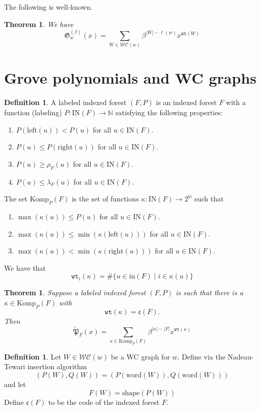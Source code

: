 \documentclass{amsart}
\newtheorem{theorem}[lemma]{Theorem}
\newcommand{\grove}{\widetilde{\mathfrak{P}}}
\theoremstyle{definition}
\newtheorem{definition}[lemma]{Definition}
\theoremstyle{remark}
\numberwithin{equation}{subsection}
\newcommand{\wtt}{\mathtt{wt}}
\newcommand{\WC}{\mathcal{WC}}
\newcommand{\code}{\mathfrak{c}}
\begin{document}
The following is well-known.
\begin{theorem}
We have
$$\mathfrak{G}^{(\beta)}_w(x) = \sum_{W\in \WC(w)} \beta^{|W|-\ell(w)}x^{\wtt(W)}$$
\end{theorem}


\section{Grove polynomials and WC graphs}

\begin{definition}
A labeled indexed forest $(F,P)$ is an indexed forest $F$ with a function (labeling) $P:\mathrm{IN}(F)\to\mathbb{N}$ satisfying the following properties:
\begin{enumerate}
\item $P(\mathrm{left}(u)) < P(u)$ for all $u\in \mathrm{IN}(F)$.
\item $P(u)\leq P(\mathrm{right}(u))$ for all $u\in \mathrm{IN}(F)$.
\item $P(u)\geq \rho_F(u)$ for all $u\in \mathrm{IN}(F)$.
\item $P(u)\leq \lambda_F(u)$ for all $u\in \mathrm{IN}(F)$.
\end{enumerate}

The set $\mathrm{Komp}_P(F)$ is the set of functions $\kappa:\mathrm{IN}(F)\to 2^{\mathbb{N}}$ such that 

\begin{enumerate}
\item $\max(\kappa(u))\leq P(u)$ for all $u\in \mathrm{IN}(F)$.
\item $\max(\kappa(u))\leq \min(\kappa(\mathrm{left}(u)))$ for all $u\in \mathrm{IN}(F)$.
\item $\max(\kappa(u))< \min(\kappa(\mathrm{right}(u)))$ for all $u\in \mathrm{IN}(F)$.
\end{enumerate}
We have that
$$\wtt_i(\kappa) = \#\{u\in \mathrm{in}(F)\mid i\in \kappa(u)\}$$
\end{definition}


\begin{theorem}
Suppose a labeled indexed forest $(F,P)$ is such that there is a $\kappa\in\mathrm{Komp}_P(F)$ with 
$$\wtt(\kappa) = \code(F).$$ 
Then
$$\grove_F(x) = \sum_{\kappa\in\mathrm{Komp}_P(F)} \beta^{|\kappa|-|F|}x^{\wtt(\kappa)}$$
\end{theorem}



\begin{definition}
Let $W\in \WC(w)$ be a WC graph for $w$. Define via the Nadeau-Tewari insertion algorithm
$$(P(W), Q(W)) = (P(\mathrm{word}(W)), Q(\mathrm{word}(W)))$$
and let
$$F(W) = \mathrm{shape}(P(W))$$
Define $\code(F)$ to be the code of the indexed forest $F$.
\end{definition}
\end{document}
